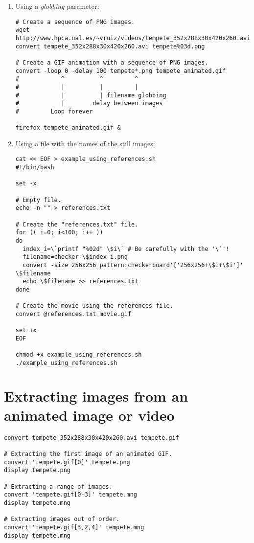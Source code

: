 \begin{enumerate}

\item Using a \emph{globbing} parameter:

\begin{lstlisting}
# Create a sequence of PNG images.
wget http://www.hpca.ual.es/~vruiz/videos/tempete_352x288x30x420x260.avi
convert tempete_352x288x30x420x260.avi tempete%03d.png

# Create a GIF animation with a sequence of PNG images.
convert -loop 0 -delay 100 tempete*.png tempete_animated.gif
#            ^          ^         ^
#            |          |         |
#            |          | filename globbing
#            |        delay between images
#         Loop forever

firefox tempete_animated.gif &
\end{lstlisting}


\item Using a file with the names of the still images:

\begin{lstlisting}
cat << EOF > example_using_references.sh
#!/bin/bash

set -x

# Empty file.
echo -n "" > references.txt

# Create the "references.txt" file.
for (( i=0; i<100; i++ ))
do
  index_i=\`printf "%02d" \$i\` # Be carefully with the '\`'!
  filename=checker-\$index_i.png
  convert -size 256x256 pattern:checkerboard'['256x256+\$i+\$i']' \$filename
  echo \$filename >> references.txt
done

# Create the movie using the references file.
convert @references.txt movie.gif

set +x
EOF

chmod +x example_using_references.sh
./example_using_references.sh
\end{lstlisting}

\end{enumerate}



\section{Extracting images from an animated image or video}

\begin{lstlisting}
convert tempete_352x288x30x420x260.avi tempete.gif

# Extracting the first image of an animated GIF.
convert 'tempete.gif[0]' tempete.png
display tempete.png

# Extracting a range of images.
convert 'tempete.gif[0-3]' tempete.mng
display tempete.mng

# Extracting images out of order.
convert 'tempete.gif[3,2,4]' tempete.mng
display tempete.mng
\end{lstlisting}

